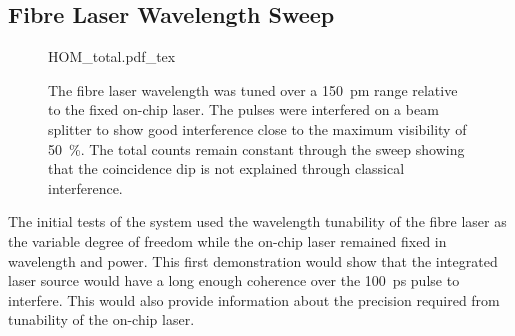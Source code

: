 

\subsection{Fibre Laser Wavelength Sweep}

\begin{figure}[p]
	\centering
	\small
	\def\svgwidth{0.9\textwidth} 
	{HOM_total.pdf_tex}
	\caption[Hong-Ou-Mandel interference between fibre components and chip]{The fibre laser wavelength was tuned over a \SI{150}{pm} range relative to the fixed on-chip laser. The pulses were interfered on a beam splitter to show good interference close to the maximum visibility of \SI{50}{\percent}. The total counts remain constant through the sweep showing that the coincidence dip is not explained through classical interference.}
	\label{fig:fibre_wavelength_sweep}
\end{figure}




The initial tests of the system used the wavelength tunability of the fibre laser as the variable degree of freedom while the on-chip laser remained fixed in wavelength and power. This first demonstration would show that the integrated laser source would have a long enough coherence over the \SI{100}{ps} pulse to interfere. This would also provide information about the precision required from tunability of the on-chip laser. 

